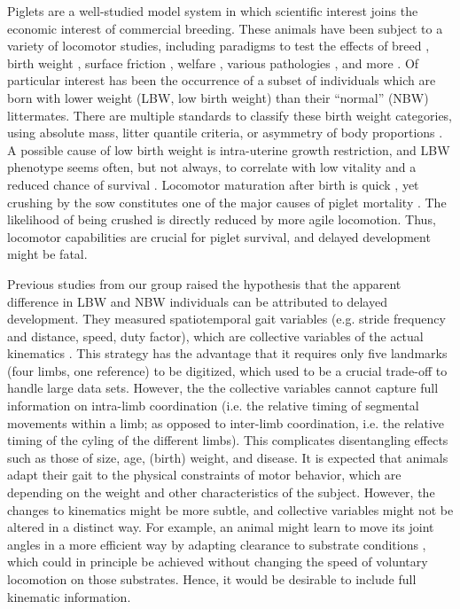 Piglets are a well-studied model system in which scientific interest joins the economic interest of commercial breeding.
These animals have been subject to a variety of locomotor studies, including paradigms to test the effects of breed \citep{Mirkiani2021}, birth weight \citep{VandenHole2017,VandenHole2018,VandenHole2021}, surface friction \citep{VanWachenfelt2008}, welfare \citep{Guesgen2017}, various pathologies \citep{Abell2014,LaVallee2020,Benasson2020}, and more \citep[\textit{cf.}][]{Netukova2021}.
Of particular interest has been the occurrence of a subset of individuals which are born with lower weight (LBW, low birth weight) than their ``normal'' (NBW) littermates.
There are multiple standards to classify these birth weight categories, using absolute mass, litter quantile criteria, or asymmetry of body proportions \citep{Quiniou2002,VanTichelen2021,Wang2016,DInca2011,Feldpausch2019,Roehe2000,Amdi2013}.
A possible cause of low birth weight is intra-uterine growth restriction, and LBW phenotype seems often, but not always, to correlate with low vitality and a reduced chance of survival \citep{Baxter2008,Hales2013,Muns2013,VanGinneken2022}.
Locomotor maturation after birth is quick \citep{Andersen2016,VandenHole2017}, yet crushing by the sow constitutes one of the major causes of piglet mortality \citep{Marchant2000,Edwards2015}.
The likelihood of being crushed is directly reduced by more agile locomotion.
Thus, locomotor capabilities are crucial for piglet survival, and delayed development might be fatal.

Previous studies from our group \citep{VandenHole2017,VandenHole2021} raised the hypothesis that the apparent difference in LBW and NBW individuals can be attributed to delayed development.
They measured spatiotemporal gait variables (e.g. stride frequency and distance, speed, duty factor), which are collective variables of the actual kinematics \citep[\textit{cf.}][]{Newell2021,Nishikawa2007,Aerts2000}.
This strategy has the advantage that it requires only five landmarks (four limbs, one reference) to be digitized, which used to be a crucial trade-off to handle large data sets.
However, the the collective variables cannot capture full information on intra-limb coordination (i.e. the relative timing of segmental movements within a limb; as opposed to inter-limb coordination, i.e. the relative timing of the cyling of the different limbs).
This complicates disentangling effects such as those of size, age, (birth) weight, and disease.
It is expected that animals adapt their gait to the physical constraints of motor behavior, which are depending on the weight and other characteristics of the subject.
However, the changes to kinematics might be more subtle, and collective variables might not be altered in a distinct way.
For example, an animal might learn to move its joint angles in a more efficient way by adapting clearance to substrate conditions \citep{VanWachenfelt2008,Mielke2019}, which could in principle be achieved without changing the speed of voluntary locomotion on those substrates.
Hence, it would be desirable to include full kinematic information.


